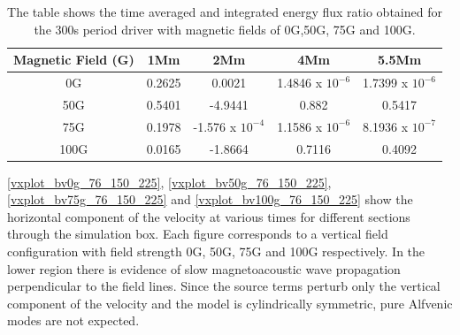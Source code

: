 \documentclass[twocolumn]{aastex62}
\begin{document}
\begin{table}\label{energyflux}
\centering
\begin{tabular}{c c c c c}
\hline
Magnetic Field (G)   &  1Mm  &  2Mm &  4Mm & 5.5Mm \\
\hline
0G & 0.2625  &    0.0021      &   1.4846 x $10^{-6}$     &   1.7399 x $10^{-6}$      \\
\hline
50G & 0.5401  &   -4.9441       &   0.882      &  0.5417     \\
\hline
75G & 0.1978  &    -1.576 x $10^{-4}$      &   1.1586 x $10^{-6}$     &   8.1936 x $10^{-7}$      \\
\hline
100G & 0.0165  &   -1.8664      &   0.7116      &   0.4092    \\
\hline

\end{tabular} 
\caption{The table shows the time averaged and integrated energy flux ratio obtained  for the 300s period driver with magnetic fields of 0G,50G, 75G and 100G.}
\label{energyfluxratio}
\end{table}


\ref{vxplot_bv0g_76_150_225}, \ref{vxplot_bv50g_76_150_225}, \ref{vxplot_bv75g_76_150_225} and \ref{vxplot_bv100g_76_150_225} show the horizontal component of the velocity at various times for different sections through the simulation box. Each figure corresponds to a vertical field configuration with field strength 0G, 50G, 75G and 100G respectively. In the lower region there is evidence of slow magnetoacoustic wave propagation perpendicular to the field lines. Since the source terms perturb only the vertical component of the velocity and the model is cylindrically symmetric, pure Alfvenic modes are not expected. 











\end{document}
